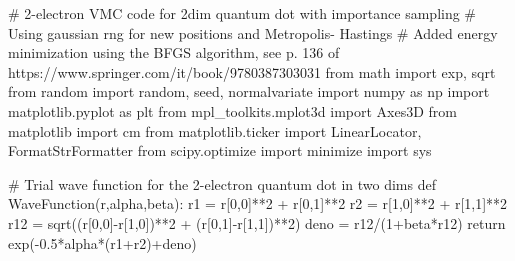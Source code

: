 \documentclass[%
oneside,                 %
final,                   %
10pt]{article}
\begin{document}
\bpycod
# 2-electron VMC code for 2dim quantum dot with importance sampling
# Using gaussian rng for new positions and Metropolis- Hastings 
# Added energy minimization using the BFGS algorithm, see p. 136 of https://www.springer.com/it/book/9780387303031
from math import exp, sqrt
from random import random, seed, normalvariate
import numpy as np
import matplotlib.pyplot as plt
from mpl_toolkits.mplot3d import Axes3D
from matplotlib import cm
from matplotlib.ticker import LinearLocator, FormatStrFormatter
from scipy.optimize import minimize
import sys


# Trial wave function for the 2-electron quantum dot in two dims
def WaveFunction(r,alpha,beta):
    r1 = r[0,0]**2 + r[0,1]**2
    r2 = r[1,0]**2 + r[1,1]**2
    r12 = sqrt((r[0,0]-r[1,0])**2 + (r[0,1]-r[1,1])**2)
    deno = r12/(1+beta*r12)
    return exp(-0.5*alpha*(r1+r2)+deno)
\end{document}
